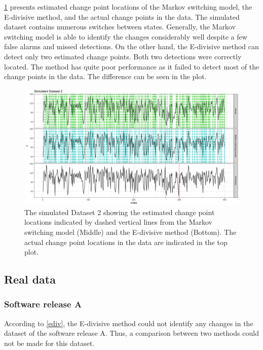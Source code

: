 \ref{compare_sim2} presents estimated change point locations of the
Markov switching model, the E-divisive method, and the actual change
points in the data. The simulated dataset contains numerous switches
between states. Generally, the Markov switching model is able to identify
the changes considerably well despite a few false alarms and missed
detections. On the other hand, the E-divisive method can detect only
two estimated change points. Both two detections were correctly located.
The method has quite poor performance as it failed to detect most
of the change points in the data. The difference can be seen in the
plot.

\begin{figure}[H]
\begin{centering}
\includegraphics[scale=0.35]{picture/compare_sim2}
\par\end{centering}
\caption{The simulated Dataset 2 showing the estimated change point locations
indicated by dashed vertical lines from the Markov switching model
(Middle) and the E-divisive method (Bottom). The actual change point
locations in the data are indicated in the top plot. }

\label{compare_sim2}
\end{figure}


\subsection{Real data \label{subsec:Real-data}}

\subsubsection{Software release A}

According to \ref{ediv}, the E-divisive method could not identify
any changes in the dataset of the software release A. Thus, a comparison
between two methods could not be made for this dataset. 


